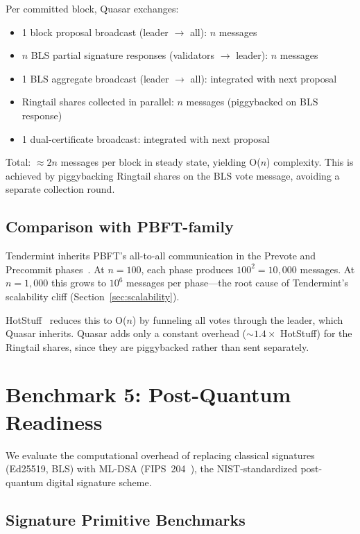 \documentclass[11pt]{article}
\begin{document}
Per committed block, Quasar exchanges:
\begin{itemize}
\item 1 block proposal broadcast (leader $\to$ all): $n$ messages
\item $n$ BLS partial signature responses (validators $\to$ leader): $n$ messages
\item 1 BLS aggregate broadcast (leader $\to$ all): integrated with next proposal
\item Ringtail shares collected in parallel: $n$ messages (piggybacked on BLS response)
\item 1 dual-certificate broadcast: integrated with next proposal
\end{itemize}

Total: $\approx 2n$ messages per block in steady state, yielding O($n$) complexity.
This is achieved by piggybacking Ringtail shares on the BLS vote message, avoiding a
separate collection round.

\subsection{Comparison with PBFT-family}

Tendermint inherits PBFT's all-to-all communication in the Prevote and
Precommit phases~\cite{tendermint}.
At $n{=}100$, each phase produces $100^2{=}10{,}000$ messages.
At $n{=}1{,}000$ this grows to $10^6$ messages per phase---the root
cause of Tendermint's scalability cliff (Section~\ref{sec:scalability}).

HotStuff~\cite{hotstuff} reduces this to O($n$) by funneling all votes through
the leader, which Quasar inherits. Quasar adds only a constant overhead
(${\sim}1.4{\times}$ HotStuff) for the Ringtail shares, since they are
piggybacked rather than sent separately.

\section{Benchmark 5: Post-Quantum Readiness}
\label{sec:pq}

We evaluate the computational overhead of replacing classical signatures (Ed25519, BLS)
with ML-DSA (FIPS~204~\cite{fips204}), the NIST-standardized post-quantum digital
signature scheme.

\subsection{Signature Primitive Benchmarks}
\end{document}
